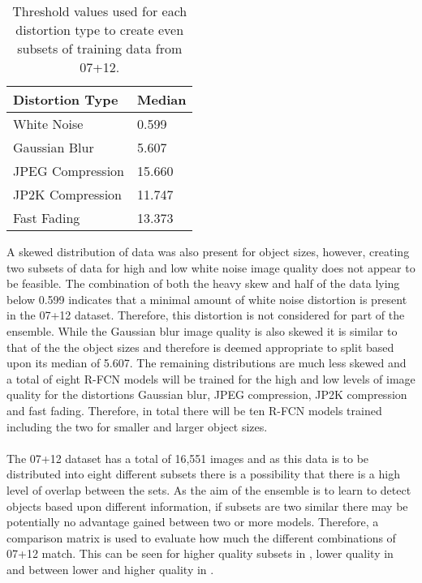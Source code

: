\documentclass[a4paper,twoside]{article}
\begin{document}
\begin{table}[h]
\centering
\caption{Threshold values used for each distortion type to create even subsets of training data from 07+12.}
\label{tab:iq_splits}
\begin{tabular}{|l|l|}
\hline
\textbf{Distortion Type}   & \textbf{Median} \\ \hline
White Noise       & 0.599  \\ \hline
Gaussian Blur     & 5.607  \\ \hline
JPEG Compression  & 15.660 \\ \hline
JP2K Compression & 11.747 \\ \hline
Fast Fading       & 13.373 \\ \hline
\end{tabular}
\end{table}

A skewed distribution of data was also present for object sizes, however, creating two subsets of data for high and low white noise image quality does not appear to be feasible. The combination of both the heavy skew and half of the data lying below 0.599 indicates that a minimal amount of white noise distortion is present in the 07+12 dataset. Therefore, this distortion is not considered for part of the ensemble. While the Gaussian blur image quality is also skewed it is similar to that of the the object sizes and therefore is deemed appropriate to split based upon its median of 5.607. The remaining distributions are much less skewed and a total of eight R-FCN models will be trained for the high and low levels of image quality for the distortions Gaussian blur, JPEG compression, JP2K compression and fast fading. Therefore, in total there will be ten R-FCN models trained including the two for smaller and larger object sizes.
\\\\
The 07+12 dataset has a total of 16,551 images and as this data is to be distributed into eight different subsets there is a possibility that there is a high level of overlap between the sets. As the aim of the ensemble is to learn to detect objects based upon different information, if subsets are two similar there may be potentially no advantage gained between two or more models. Therefore, a comparison matrix is used to evaluate how much the different combinations of 07+12 match. This can be seen for higher quality subsets in , lower quality in  and between lower and higher quality in .
\end{document}
